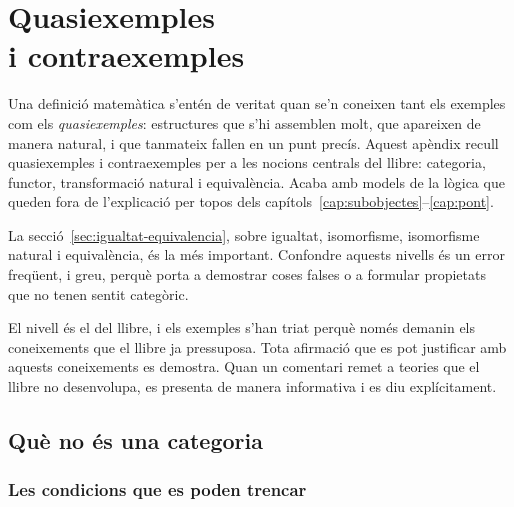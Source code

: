 \chapter[Quasiexemples i contraexemples]{Quasiexemples\\ i contraexemples}
\label{cap:contraexemples}

Una definició matemàtica s'entén de veritat quan se'n coneixen tant els exemples com els \emph{quasiexemples}: estructures que s'hi assemblen molt, que apareixen de manera natural, i que tanmateix fallen en un punt precís. Aquest apèndix recull quasiexemples i contraexemples per a les nocions centrals del llibre: categoria, functor, transformació natural i equivalència. Acaba amb models de la lògica que queden fora de l'explicació per topos dels capítols~\ref{cap:subobjectes}--\ref{cap:pont}.

La secció~\ref{sec:igualtat-equivalencia}, sobre igualtat, isomorfisme, isomorfisme natural i equivalència, és la més important. Confondre aquests nivells és un error freqüent, i greu, perquè porta a demostrar coses falses o a formular propietats que no tenen sentit categòric.

El nivell és el del llibre, i els exemples s'han triat perquè només demanin els coneixements que el llibre ja pressuposa. Tota afirmació que es pot justificar amb aquests coneixements es demostra. Quan un comentari remet a teories que el llibre no desenvolupa, es presenta de manera informativa i es diu explícitament.

\section{Què no és una categoria}
\label{sec:no-categoria}

\subsection{Les condicions que es poden trencar}

